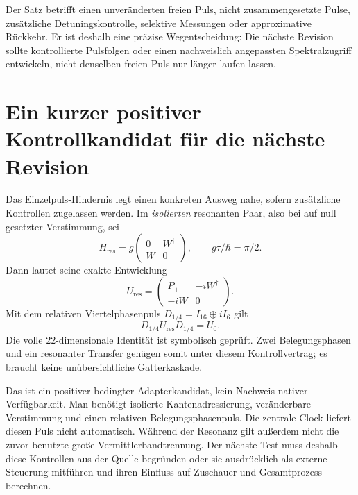 Der Satz betrifft einen unveränderten freien Puls, nicht zusammengesetzte Pulse, zusätzliche Detuningskontrolle, selektive Messungen oder approximative Rückkehr. Er ist deshalb eine präzise Wegentscheidung: Die nächste Revision sollte kontrollierte Pulsfolgen oder einen nachweislich angepassten Spektralzugriff entwickeln, nicht denselben freien Puls nur länger laufen lassen.

\section{Ein kurzer positiver Kontrollkandidat für die nächste Revision}
Das Einzelpuls-Hindernis legt einen konkreten Ausweg nahe, sofern zusätzliche Kontrollen zugelassen werden. Im \emph{isolierten} resonanten Paar, also bei auf null gesetzter Verstimmung, sei
\begin{equation}
H_{\mathrm{res}}=g\begin{pmatrix}0&W^\dagger\\W&0\end{pmatrix},
\qquad g\tau/\hbar=\pi/2.
\end{equation}
Dann lautet seine exakte Entwicklung
\begin{equation}
U_{\mathrm{res}}=
\begin{pmatrix}P_+&-iW^\dagger\\-iW&0\end{pmatrix}.
\end{equation}
Mit dem relativen Viertelphasenpuls $D_{1/4}=I_{16}\oplus iI_6$ gilt
\begin{equation}
\boxed{D_{1/4}U_{\mathrm{res}}D_{1/4}=U_0.}
\end{equation}
Die volle 22-dimensionale Identität ist symbolisch geprüft. Zwei Belegungsphasen und ein resonanter Transfer genügen somit unter diesem Kontrollvertrag; es braucht keine unübersichtliche Gatterkaskade.

Das ist ein positiver bedingter Adapterkandidat, kein Nachweis nativer Verfügbarkeit. Man benötigt isolierte Kantenadressierung, veränderbare Verstimmung und einen relativen Belegungsphasenpuls. Die zentrale Clock liefert diesen Puls nicht automatisch. Während der Resonanz gilt außerdem nicht die zuvor benutzte große Vermittlerbandtrennung. Der nächste Test muss deshalb diese Kontrollen aus der Quelle begründen oder sie ausdrücklich als externe Steuerung mitführen und ihren Einfluss auf Zuschauer und Gesamtprozess berechnen.

